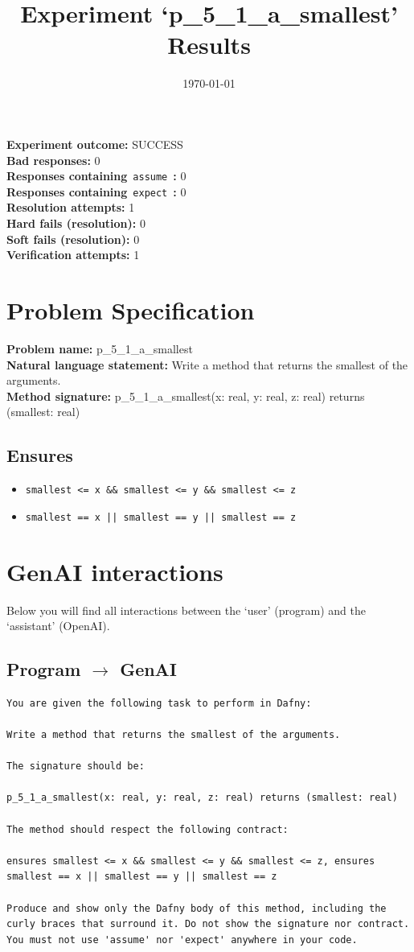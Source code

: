 \documentclass{article}
\begin{document}
\title{Experiment `p\_5\_1\_a\_smallest' Results}
\author{\today}
\date{}
\maketitle
\textbf{Experiment outcome: }SUCCESS
\\\textbf{Bad responses: }0
\\\textbf{Responses containing}~\texttt{assume}~\textbf{: }0
\\\textbf{Responses containing}~\texttt{expect}~\textbf{: }0
\\\textbf{Resolution attempts: }1
\\\textbf{Hard fails (resolution): }0
\\\textbf{Soft fails (resolution): }0
\\\textbf{Verification attempts: }1
\section*{Problem Specification}
\textbf{Problem name: }p\_5\_1\_a\_smallest
\\\textbf{Natural language statement: }Write a method that returns the smallest of the arguments.
\\\textbf{Method signature: }p\_5\_1\_a\_smallest(x: real, y: real, z: real) returns (smallest: real)
\subsection*{Ensures}
\begin{itemize}
\item \texttt{smallest <= x \&\& smallest <= y \&\& smallest <= z}
\item \texttt{smallest == x || smallest == y || smallest == z}
\end{itemize}
\clearpage
\section*{GenAI interactions}
Below you will find all interactions between the `user' (program) and the `assistant' (OpenAI).
\subsection*{Program $\rightarrow$ GenAI}
\begin{lstlisting}
You are given the following task to perform in Dafny:

Write a method that returns the smallest of the arguments.

The signature should be:

p_5_1_a_smallest(x: real, y: real, z: real) returns (smallest: real)

The method should respect the following contract:

ensures smallest <= x && smallest <= y && smallest <= z, ensures smallest == x || smallest == y || smallest == z

Produce and show only the Dafny body of this method, including the curly braces that surround it. Do not show the signature nor contract. You must not use 'assume' nor 'expect' anywhere in your code.
\end{lstlisting}
\end{document}
